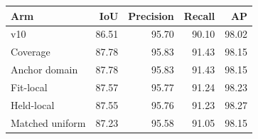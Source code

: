 \begin{tabular}{lrrrr}
\toprule
Arm & IoU & Precision & Recall & AP \\
\midrule
v10 & 86.51 & 95.70 & 90.10 & 98.02 \\
Coverage & 87.78 & 95.83 & 91.43 & 98.15 \\
Anchor domain & 87.78 & 95.83 & 91.43 & 98.15 \\
Fit-local & 87.57 & 95.77 & 91.24 & 98.23 \\
Held-local & 87.55 & 95.76 & 91.23 & 98.27 \\
Matched uniform & 87.23 & 95.58 & 91.05 & 98.15 \\
\bottomrule
\end{tabular}
